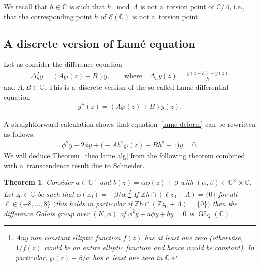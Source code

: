 \documentclass[10pt,a4paper]{amsart}
\numberwithin{equation}{section}
\newtheorem{Theorem}{Theorem}[section]
\begin{document}
We recall that $h \in \mathbb C$ is such that $h \mod \Lambda$ is not a~torsion point of $\mathbb C/\Lambda$, i.e.,
that the corresponding point $\underline{h}$ of $\mathcal{E}(\mathbb C)$ is not a~torsion point.

\subsection{A discrete version of Lam\'e equation}
\label{sec61}
Let us consider the dif\/ference equation
\begin{gather}
\label{lame deform}
\Delta_h^2 y = (A\wp(z)+B)y, \qquad  \text{where} \quad \Delta_h y(z)= \frac{y(z+h)-y(z)}{h}
\end{gather}
and $A,B \in \mathbb C$.
This is a~discrete version of the so-called Lam\'e dif\/ferential equation
\begin{gather*}
y''(z) = (A\wp(z)+B)y(z).
\end{gather*}

A straightforward calculation shows that equation~\eqref{lame deform} can be rewritten as follows:
\begin{gather*}
\phi^2 y -2\phi y+\big({-}Ah^2\wp(z)-Bh^2+1\big)y=0.
\end{gather*}
We will deduce Theorem~\ref{theo lame alg} from the following theorem combined with a~transcendence result due to
Schneider.

\begin{Theorem}
\label{theo3}
Consider $a\in \mathbb C^{\times}$ and $b(z)=\alpha \wp(z) + \beta$ with $(\alpha,\beta) \in \mathbb C^{\times} \times
\mathbb C$.
Let $z_0 \in \mathbb C$ be such that $\wp(z_0)=-\beta/\alpha$.\footnote{Any non constant elliptic function $f(z)$ has at
least one zero (otherwise, $1/f(z)$ would be an entire elliptic function and hence would be constant).
In particular, $\wp(z)+\beta/\alpha$ has a~least one zero in $\mathbb C$.}
If $\mathbb Z h \cap (\ell z_{0} + \Lambda)=\{0\}$ for all $\ell \in \{-8,\dots,8\}$ $($this holds in particular if
$\mathbb Z h \cap (\mathbb Z z_{0} + \Lambda)=\{0\})$ then the difference Galois group over $(K,\phi)$ of $\phi^2 y
+a\phi y+by=0$ is $\operatorname{GL}_{2}(\mathbb C)$.
\end{Theorem}
\end{document}
